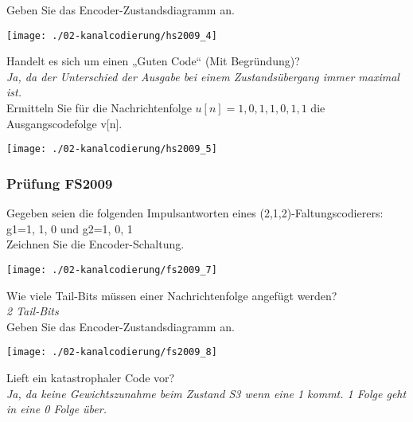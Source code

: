 Geben Sie das Encoder-Zustandsdiagramm an.\\
\begin{center}
    \vspace{-8pt}
    \texttt{[image: ./02-kanalcodierung/hs2009\_4]}
    \vspace{-8pt}
\end{center}

Handelt es sich um einen „Guten Code“ (Mit Begründung)?\\
\textit{Ja, da der Unterschied der Ausgabe bei einem Zustandsübergang immer maximal ist.}\\

Ermitteln Sie für die Nachrichtenfolge ${u[n]}={1,0,1,1,0,1,1}$ die Ausgangscodefolge {v[n]}.\\
\begin{center}
    \vspace{-8pt}
    \texttt{[image: ./02-kanalcodierung/hs2009\_5]}
    \vspace{-8pt}
\end{center}

\subsubsection{Prüfung FS2009}
Gegeben seien die folgenden Impulsantworten eines (2,1,2)-Faltungscodierers: {g1}={1, 1, 0} und {g2}={1, 0, 1}\\

Zeichnen Sie die Encoder-Schaltung.
\begin{center}
    \vspace{-8pt}
    \texttt{[image: ./02-kanalcodierung/fs2009\_7]}
    \vspace{-8pt}
\end{center}

Wie viele Tail-Bits müssen einer Nachrichtenfolge angefügt werden?\\
\textit{2 Tail-Bits}\\

Geben Sie das Encoder-Zustandsdiagramm an.
\begin{center}
    \vspace{-8pt}
    \texttt{[image: ./02-kanalcodierung/fs2009\_8]}
    \vspace{-8pt}
\end{center}

Lieft ein katastrophaler Code vor?\\
\textit{Ja, da keine Gewichtszunahme beim Zustand S3 wenn eine 1 kommt. 1 Folge geht in eine 0 Folge über.}\\

